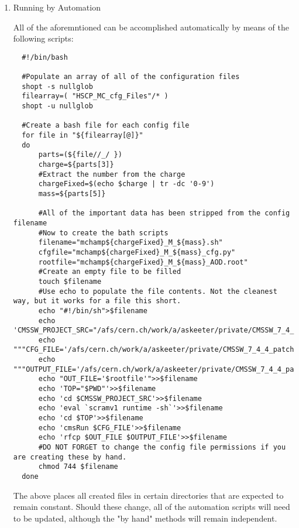 \documentclass[11 pt , letterpaper , twoside , openright]{book}
\begin{document}
\begin{enumerate}
\begin{enumerate}
Check your job status with: "bjobs"
Kill jobs with "bkill -J job1"
Using bkill without any job specified will kill ALL of your jobs.

\item Running by Automation
\label{sec-1-1-2-2-2}

All of the aforemntioned can be accomplished automatically by
means of the following scripts:

\lstset{language=sh,label=batch-creator,caption= ,numbers=none}
\begin{lstlisting}
  #!/bin/bash

  #Populate an array of all of the configuration files
  shopt -s nullglob
  filearray=( "HSCP_MC_cfg_Files"/* )
  shopt -u nullglob

  #Create a bash file for each config file
  for file in "${filearray[@]}"
  do
      parts=(${file//_/ })
      charge=${parts[3]}
      #Extract the number from the charge
      chargeFixed=$(echo $charge | tr -dc '0-9')
      mass=${parts[5]}

      #All of the important data has been stripped from the config filename
      #Now to create the bath scripts
      filename="mchamp${chargeFixed}_M_${mass}.sh"
      cfgfile="mchamp${chargeFixed}_M_${mass}_cfg.py"
      rootfile="mchamp${chargeFixed}_M_${mass}_AOD.root"
      #Create an empty file to be filled
      touch $filename
      #Use echo to populate the file contents. Not the cleanest way, but it works for a file this short.
      echo "#!/bin/sh">$filename
      echo 'CMSSW_PROJECT_SRC="/afs/cern.ch/work/a/askeeter/private/CMSSW_7_4_4_patch4/src/"'>>$filename
      echo """CFG_FILE='/afs/cern.ch/work/a/askeeter/private/CMSSW_7_4_4_patch4/src/HSCP_MC_cfg_Files/${cfgfile}'""">>$filename
      echo """OUTPUT_FILE='/afs/cern.ch/work/a/askeeter/private/CMSSW_7_4_4_patch4/src/HSCP_MC_Root_Files/$rootfile'""">>$filename
      echo "OUT_FILE='$rootfile'">>$filename
      echo 'TOP="$PWD"'>>$filename
      echo 'cd $CMSSW_PROJECT_SRC'>>$filename
      echo 'eval `scramv1 runtime -sh`'>>$filename
      echo 'cd $TOP'>>$filename
      echo 'cmsRun $CFG_FILE'>>$filename
      echo 'rfcp $OUT_FILE $OUTPUT_FILE'>>$filename
      #DO NOT FORGET to change the config file permissions if you are creating these by hand.
      chmod 744 $filename
  done
\end{lstlisting}

The above places all created files in certain directories that
are expected to remain constant. Should these change, all of the
automation scripts will need to be updated, although the "by
hand" methods will remain independent.


\end{enumerate}
\end{enumerate}
\end{document}
